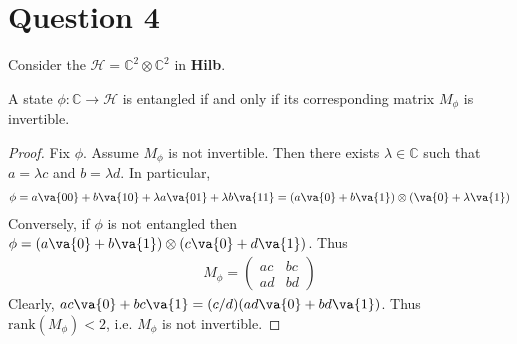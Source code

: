 \documentclass{article}
\begin{document}
\section*{Question 4}

Consider the $\mathcal H=\mathbb C^2\otimes\mathbb C^2$ in \textbf{Hilb}.

\begin{claim*}[a]
  A state $\phi : \mathbb C\to \mathcal H$ is entangled if and only if its corresponding
  matrix $M_\phi$ is invertible.
  \begin{proof}
    Fix $\phi$. Assume $M_\phi$ is not invertible. Then there exists $\lambda\in\mathbb C$
    such that $a=\lambda c$ and $b=\lambda d$. In particular,
    \begin{align*}
      \phi
      = a\va{00}+b\va{10}+\lambda a\va{01}+\lambda b\va{11}
      = (a\va{0}+b\va{1})\otimes(\va{0}+\lambda\va{1})
    \end{align*}
    Conversely, if $\phi$ is not entangled then
    $\phi = (a\va{0}+b\va{1})\otimes(c\va{0}+d\va{1})$. Thus
    \begin{align*}
      M_\phi =
      \begin{pmatrix}
        ac & bc \\
        ad & bd
      \end{pmatrix}
    \end{align*}
    Clearly, $ac\va{0}+bc\va{1}=(c/d)(ad\va{0}+bd\va{1})$. Thus
    $\text{rank}(M_\phi) < 2$, i.e. $M_\phi$ is not invertible.
  \end{proof}
\end{claim*}
\end{document}
